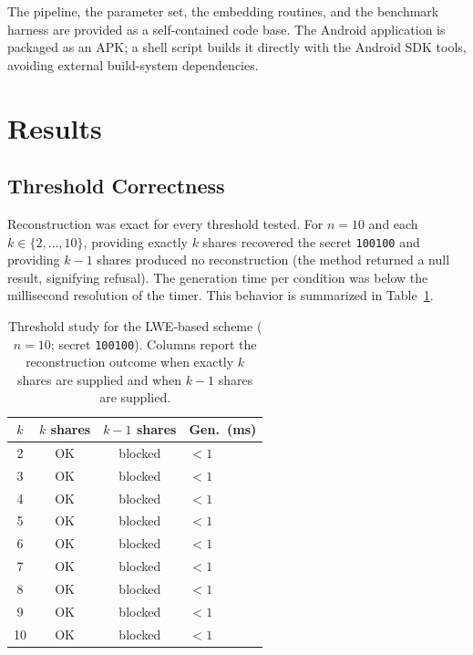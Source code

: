 \documentclass[runningheads]{llncs}
\begin{document}
The pipeline, the parameter set, the embedding routines, and the benchmark
harness are provided as a self-contained code base. The Android application is
packaged as an APK; a shell script builds it directly with the Android SDK
tools, avoiding external build-system dependencies.

\section{Results}
\label{sec:results}

\subsection{Threshold Correctness}

Reconstruction was exact for every threshold tested. For $n = 10$ and each
$k \in \{2,\dots,10\}$, providing exactly $k$ shares recovered the secret
\texttt{100100} and providing $k-1$ shares produced no reconstruction (the
method returned a null result, signifying refusal). The generation time per
condition was below the millisecond resolution of the timer. This behavior is
summarized in Table~\ref{tab:threshold}.

\begin{table}[t]
\centering
\caption{Threshold study for the LWE-based scheme ($n = 10$; secret
\texttt{100100}). Columns report the reconstruction outcome when exactly $k$
shares are supplied and when $k-1$ shares are supplied.}
\label{tab:threshold}
\begin{tabular}{cccl}
\toprule
$k$ & $k$ shares & $k-1$ shares & Gen.\ (ms)\\
\midrule
2  & OK & blocked & $<1$\\
3  & OK & blocked & $<1$\\
4  & OK & blocked & $<1$\\
5  & OK & blocked & $<1$\\
6  & OK & blocked & $<1$\\
7  & OK & blocked & $<1$\\
8  & OK & blocked & $<1$\\
9  & OK & blocked & $<1$\\
10 & OK & blocked & $<1$\\
\bottomrule
\end{tabular}
\end{table}
\end{document}
